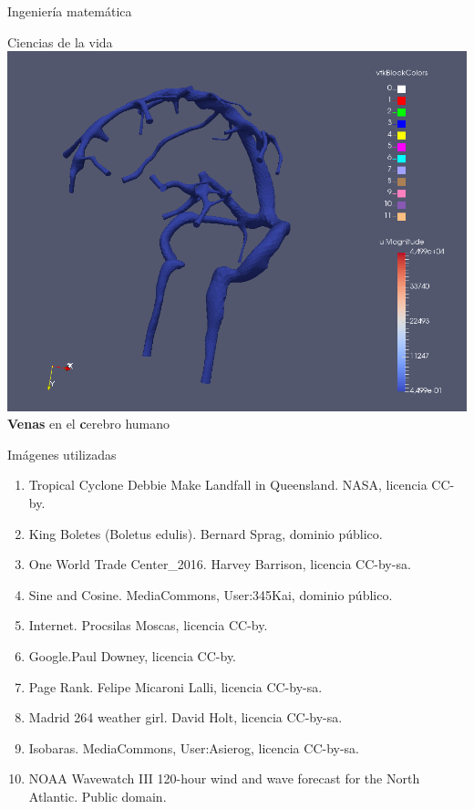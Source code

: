 \documentclass[
  unknownkeysallowed %
]{beamer}
\begin{document}
\begin{frame}{Ingeniería matemática}

\end{frame}

\begin{frame}{Ciencias de la vida}
  \includegraphics[width=0.8\linewidth]{img/brain}
  \\
  \textbf{Venas} en el \alert{\textbf cerebro humano}
\end{frame}

\begin{frame}{Imágenes utilizadas}
  \scriptsize
  \begin{enumerate}
  \item Tropical Cyclone Debbie Make Landfall in Queensland. NASA, licencia CC-by.
  \item King Boletes (Boletus edulis). Bernard Sprag, dominio público.
  \item One World Trade Center\_2016. Harvey Barrison, licencia CC-by-sa.
  \item Sine and Cosine. MediaCommons, User:345Kai, dominio público.
  \item Internet. Procsilas Moscas, licencia CC-by.
  \item Google.Paul Downey, licencia CC-by.
  \item Page Rank. Felipe Micaroni Lalli, licencia CC-by-sa.
  \item Madrid 264 weather girl. David Holt, licencia CC-by-sa.
  \item Isobaras. MediaCommons, User:Asierog, licencia CC-by-sa.
  \item NOAA Wavewatch III 120-hour wind and wave forecast for the
    North Atlantic. Public domain.
  \end{enumerate}
\end{frame}
\end{document}
